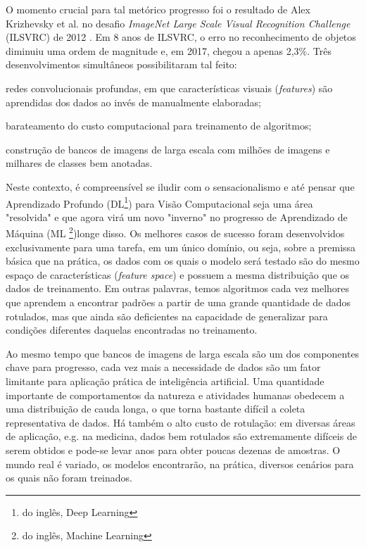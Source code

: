 \documentclass[
12pt, %
a4paper, %
onecolumn, %
]{article}
\begin{document}
O momento crucial para tal metórico progresso foi o resultado de Alex Krizhevsky et al.\cite{alexnet} no desafio \textit{ImageNet Large Scale Visual Recognition Challenge}  (ILSVRC) de 2012 \cite{goodfellow}. Em 8 anos de ILSVRC, o erro no reconhecimento de objetos diminuiu uma ordem de magnitude\cite{fei} e, em 2017, chegou a apenas 2,3\%. Três desenvolvimentos simultâneos possibilitaram tal feito\cite{horn}: 
\begin{enumerate*}[label=(\alph*)]
  \item redes convolucionais profundas, em que características visuais (\textit{features}) são aprendidas dos dados ao invés de manualmente elaboradas;
  \item barateamento do custo computacional para treinamento de algoritmos;
  \item construção de bancos de imagens de larga escala com milhões de imagens e milhares de classes bem anotadas. 
\end{enumerate*}

Neste contexto, é compreensível se iludir com o sensacionalismo e até pensar que Aprendizado Profundo (DL\footnote{do inglês, Deep Learning}) para Visão Computacional seja uma área "resolvida" e que agora virá um novo "inverno" no progresso de Aprendizado de Máquina (ML \footnote{do inglês, Machine Learning})\textemdash longe disso. Os melhores casos de sucesso foram desenvolvidos exclusivamente para uma tarefa, em um único domínio, ou seja, sobre a premissa básica que na prática, os dados com os quais o modelo será testado são do mesmo espaço de características (\textit{feature space}) e possuem a mesma distribuição que os dados de treinamento\cite{Pan}. Em outras palavras, temos algoritmos cada vez melhores que aprendem a encontrar padrões a partir de uma grande quantidade de dados rotulados, mas que ainda são deficientes na capacidade de generalizar para condições diferentes daquelas encontradas no treinamento. 

Ao mesmo tempo que bancos de imagens de larga escala são um dos componentes chave para progresso, cada vez mais a necessidade de dados são um fator limitante para aplicação prática de inteligência artificial.  Uma quantidade importante de comportamentos da natureza e atividades humanas obedecem a uma distribuição de cauda longa, o que torna bastante difícil a coleta representativa de dados. Há também o  alto custo de rotulação: em diversas áreas de aplicação, e.g. na medicina, dados bem rotulados são extremamente difíceis de serem obtidos e pode-se levar anos para obter poucas dezenas de amostras. O mundo real é variado, os modelos encontrarão, na prática, diversos cenários para os quais não foram treinados.
\end{document}
